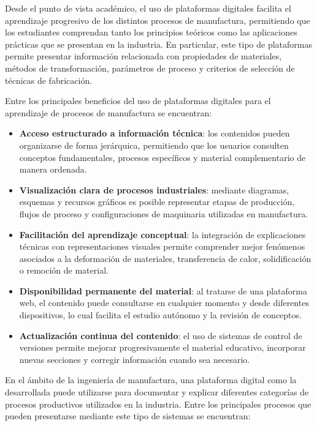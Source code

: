 \documentclass[12pt,letterpaper]{article}
\begin{document}
Desde el punto de vista académico, el uso de plataformas digitales facilita el aprendizaje progresivo de los distintos procesos de manufactura, permitiendo que los estudiantes comprendan tanto los principios teóricos como las aplicaciones prácticas que se presentan en la industria. En particular, este tipo de plataformas permite presentar información relacionada con propiedades de materiales, métodos de transformación, parámetros de proceso y criterios de selección de técnicas de fabricación.

Entre los principales beneficios del uso de plataformas digitales para el aprendizaje de procesos de manufactura se encuentran:

\begin{itemize}

\item \textbf{Acceso estructurado a información técnica}: los contenidos pueden organizarse de forma jerárquica, permitiendo que los usuarios consulten conceptos fundamentales, procesos específicos y material complementario de manera ordenada.

\item \textbf{Visualización clara de procesos industriales}: mediante diagramas, esquemas y recursos gráficos es posible representar etapas de producción, flujos de proceso y configuraciones de maquinaria utilizadas en manufactura.

\item \textbf{Facilitación del aprendizaje conceptual}: la integración de explicaciones técnicas con representaciones visuales permite comprender mejor fenómenos asociados a la deformación de materiales, transferencia de calor, solidificación o remoción de material.

\item \textbf{Disponibilidad permanente del material}: al tratarse de una plataforma web, el contenido puede consultarse en cualquier momento y desde diferentes dispositivos, lo cual facilita el estudio autónomo y la revisión de conceptos.

\item \textbf{Actualización continua del contenido}: el uso de sistemas de control de versiones permite mejorar progresivamente el material educativo, incorporar nuevas secciones y corregir información cuando sea necesario.

\end{itemize}

En el ámbito de la ingeniería de manufactura, una plataforma digital como la desarrollada puede utilizarse para documentar y explicar diferentes categorías de procesos productivos utilizados en la industria. Entre los principales procesos que pueden presentarse mediante este tipo de sistemas se encuentran:
\end{document}
